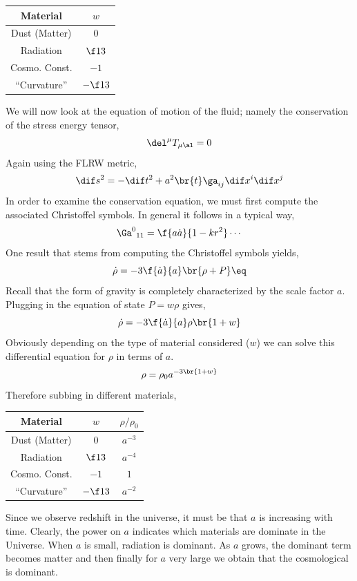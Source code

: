 \documentclass{article}
\begin{document}
\begin{center}
\begin{tabular}{|c|c|}
    \hline
    Material & $w$ \\
    \hline
    Dust (Matter) & $0$ \\
    Radiation & $\f13$ \\
    Cosmo. Const. & $-1$ \\
    ``Curvature'' & $-\f13$ \\
    \hline
\end{tabular}
\end{center}
We will now look at the equation of motion of the fluid; namely the conservation of the stress energy tensor,
\[ \del^\mu T_{\mu\al} = 0 \]
Again using the FLRW metric,
\[ \dif s^2 = - \dif t^2 + a^2 \br{t} \ga_{ij} \dif x^i \dif x^j \]
In order to examine the conservation equation, we must first compute the associated Christoffel symbols. In general it follows in a typical way,
\[ {\Ga^{0}}_{11} = \f{a \dot{a}}{1 - k r^2} \cdots \]
One result that stems from computing the Christoffel symbols yields,
\[ \dot{\rho} = - 3 \f{\dot{a}}{a} \br{\rho + P} \eq \label{eq:densityevolution}\]
Recall that the form of gravity is completely characterized by the scale factor $a$. Plugging in the equation of state $P = w \rho$ gives,
\[ \dot{\rho} = - 3 \f{\dot{a}}{a}\rho \br{1 + w} \]
Obviously depending on the type of material considered ($w$) we can solve this differential equation for $\rho$ in terms of $a$.
\[ \rho = \rho_0 a^{-3 \br{1 + w}} \]
Therefore subbing in different materials,

\begin{center}
\begin{tabular}{|c|c|c|}
    \hline
    Material & $w$ & $\rho/\rho_0$\\
    \hline
    Dust (Matter) & $0$ & $a^{-3}$\\
    Radiation & $\f13$ & $a^{-4}$ \\
    Cosmo. Const. & $-1$ & $1$ \\
    ``Curvature'' & $-\f13$ & $a^{-2}$ \\
    \hline
\end{tabular}
\end{center}

Since we observe redshift in the universe, it must be that $a$ is increasing with time. Clearly, the power on $a$ indicates which materials are dominate in the Universe. When $a$ is small, radiation is dominant. As $a$ grows, the dominant term becomes matter and then finally for $a$ very large we obtain that the cosmological is dominant. \\
\end{document}
